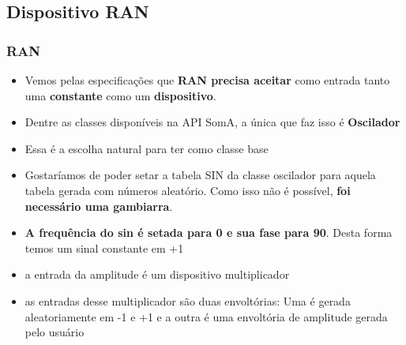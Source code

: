 \documentclass{beamer}
\begin{document}
\subsection{Dispositivo RAN}
\begin{frame}[fragile]
	\frametitle{RAN}
	\begin{itemize}
		\item Vemos pelas especificações que \textbf{RAN precisa aceitar} como entrada
		tanto uma \textbf{constante} como um \textbf{dispositivo}.
		\item Dentre as classes disponíveis na API SomA, a única que faz
		isso é \textbf{Oscilador}
		\item Essa é a escolha natural para ter como classe base
		\item Gostaríamos de poder setar a tabela SIN da classe oscilador
		para aquela tabela gerada com números aleatório. Como isso não é possível,
		\textbf{foi necessário uma gambiarra}.
		\item \textbf{A frequência do sin é setada para 0 e sua fase para 90}. Desta forma temos um sinal constante em +1
		\item a entrada da amplitude é um dispositivo multiplicador
		\item as entradas desse multiplicador são duas envoltórias: Uma é gerada
		aleatoriamente em -1 e +1 e a outra é uma envoltória de amplitude gerada pelo usuário
	\end{itemize}
\end{frame}
\end{document}
